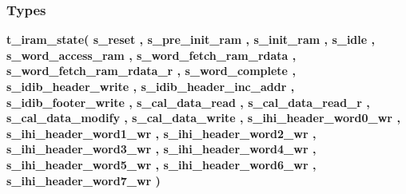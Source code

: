 \subsubsection*{Types}
 \begin{DoxyCompactItemize}
\item 
{\bfseries {\bf t\+\_\+iram\+\_\+state}{\bfseries \textcolor{vhdlchar}{(}\textcolor{vhdlchar}{ }\textcolor{vhdlchar}{s\+\_\+reset}\textcolor{vhdlchar}{ }\textcolor{vhdlchar}{,}\textcolor{vhdlchar}{ }\textcolor{vhdlchar}{s\+\_\+pre\+\_\+init\+\_\+ram}\textcolor{vhdlchar}{ }\textcolor{vhdlchar}{,}\textcolor{vhdlchar}{ }\textcolor{vhdlchar}{s\+\_\+init\+\_\+ram}\textcolor{vhdlchar}{ }\textcolor{vhdlchar}{,}\textcolor{vhdlchar}{ }\textcolor{vhdlchar}{s\+\_\+idle}\textcolor{vhdlchar}{ }\textcolor{vhdlchar}{,}\textcolor{vhdlchar}{ }\textcolor{vhdlchar}{s\+\_\+word\+\_\+access\+\_\+ram}\textcolor{vhdlchar}{ }\textcolor{vhdlchar}{,}\textcolor{vhdlchar}{ }\textcolor{vhdlchar}{s\+\_\+word\+\_\+fetch\+\_\+ram\+\_\+rdata}\textcolor{vhdlchar}{ }\textcolor{vhdlchar}{,}\textcolor{vhdlchar}{ }\textcolor{vhdlchar}{s\+\_\+word\+\_\+fetch\+\_\+ram\+\_\+rdata\+\_\+r}\textcolor{vhdlchar}{ }\textcolor{vhdlchar}{,}\textcolor{vhdlchar}{ }\textcolor{vhdlchar}{s\+\_\+word\+\_\+complete}\textcolor{vhdlchar}{ }\textcolor{vhdlchar}{,}\textcolor{vhdlchar}{ }\textcolor{vhdlchar}{s\+\_\+idib\+\_\+header\+\_\+write}\textcolor{vhdlchar}{ }\textcolor{vhdlchar}{,}\textcolor{vhdlchar}{ }\textcolor{vhdlchar}{s\+\_\+idib\+\_\+header\+\_\+inc\+\_\+addr}\textcolor{vhdlchar}{ }\textcolor{vhdlchar}{,}\textcolor{vhdlchar}{ }\textcolor{vhdlchar}{s\+\_\+idib\+\_\+footer\+\_\+write}\textcolor{vhdlchar}{ }\textcolor{vhdlchar}{,}\textcolor{vhdlchar}{ }\textcolor{vhdlchar}{s\+\_\+cal\+\_\+data\+\_\+read}\textcolor{vhdlchar}{ }\textcolor{vhdlchar}{,}\textcolor{vhdlchar}{ }\textcolor{vhdlchar}{s\+\_\+cal\+\_\+data\+\_\+read\+\_\+r}\textcolor{vhdlchar}{ }\textcolor{vhdlchar}{,}\textcolor{vhdlchar}{ }\textcolor{vhdlchar}{s\+\_\+cal\+\_\+data\+\_\+modify}\textcolor{vhdlchar}{ }\textcolor{vhdlchar}{,}\textcolor{vhdlchar}{ }\textcolor{vhdlchar}{s\+\_\+cal\+\_\+data\+\_\+write}\textcolor{vhdlchar}{ }\textcolor{vhdlchar}{,}\textcolor{vhdlchar}{ }\textcolor{vhdlchar}{s\+\_\+ihi\+\_\+header\+\_\+word0\+\_\+wr}\textcolor{vhdlchar}{ }\textcolor{vhdlchar}{,}\textcolor{vhdlchar}{ }\textcolor{vhdlchar}{s\+\_\+ihi\+\_\+header\+\_\+word1\+\_\+wr}\textcolor{vhdlchar}{ }\textcolor{vhdlchar}{,}\textcolor{vhdlchar}{ }\textcolor{vhdlchar}{s\+\_\+ihi\+\_\+header\+\_\+word2\+\_\+wr}\textcolor{vhdlchar}{ }\textcolor{vhdlchar}{,}\textcolor{vhdlchar}{ }\textcolor{vhdlchar}{s\+\_\+ihi\+\_\+header\+\_\+word3\+\_\+wr}\textcolor{vhdlchar}{ }\textcolor{vhdlchar}{,}\textcolor{vhdlchar}{ }\textcolor{vhdlchar}{s\+\_\+ihi\+\_\+header\+\_\+word4\+\_\+wr}\textcolor{vhdlchar}{ }\textcolor{vhdlchar}{,}\textcolor{vhdlchar}{ }\textcolor{vhdlchar}{s\+\_\+ihi\+\_\+header\+\_\+word5\+\_\+wr}\textcolor{vhdlchar}{ }\textcolor{vhdlchar}{,}\textcolor{vhdlchar}{ }\textcolor{vhdlchar}{s\+\_\+ihi\+\_\+header\+\_\+word6\+\_\+wr}\textcolor{vhdlchar}{ }\textcolor{vhdlchar}{,}\textcolor{vhdlchar}{ }\textcolor{vhdlchar}{s\+\_\+ihi\+\_\+header\+\_\+word7\+\_\+wr}\textcolor{vhdlchar}{ }\textcolor{vhdlchar}{)}\textcolor{vhdlchar}{ }}} 
\end{DoxyCompactItemize}
